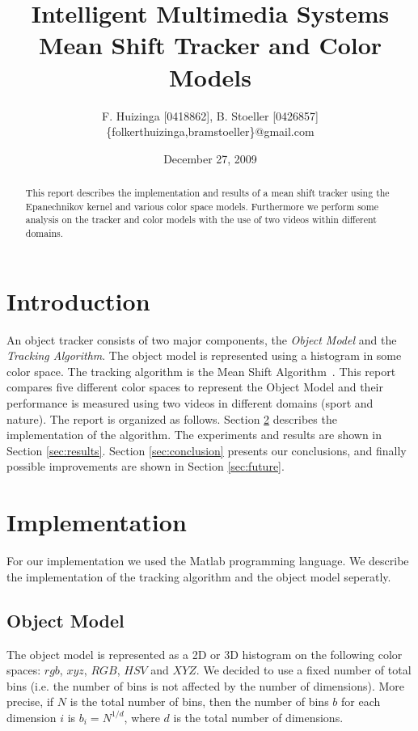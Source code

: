 \documentclass[11pt]{article}
\title{Intelligent Multimedia Systems \\ Mean Shift Tracker and Color Models}
\author{F. Huizinga [0418862], B. Stoeller [0426857] \\
      \{folkerthuizinga,bramstoeller\}@gmail.com}
\date{December 27, 2009}
\begin{document}
\maketitle

\begin{abstract}
This report describes the implementation and results of a mean shift tracker
using the Epanechnikov kernel and various color space models. Furthermore we
perform some analysis on the tracker and color models with the use of two
videos within different domains.
\end{abstract}


\section{Introduction} \label{sec:intro}
An object tracker consists of two major components, the \emph{Object Model} and
the \emph{Tracking Algorithm}. The object model is represented using a
histogram in some color space. The tracking algorithm is the Mean Shift
Algorithm~\cite{kernel-basedobject, real-timetracking}. This report compares
five different color spaces to represent the Object Model and their performance
is measured using two videos in different domains (sport and nature). The
report is organized as follows.  Section \ref{sec:implementation} describes the
implementation of the algorithm. The experiments and results are shown in
Section \ref{sec:results}. Section \ref{sec:conclusion} presents our
conclusions, and finally possible improvements are shown in Section
\ref{sec:future}.


\section{Implementation} \label{sec:implementation}
For our implementation we used the Matlab programming language. We describe the
implementation of the tracking algorithm and the object model seperatly.

\subsection{Object Model} \label{sec:model}
The object model is represented as a 2D or 3D histogram on the following color
spaces: $rgb$, $xyz$, $RGB$, $HSV$ and $XYZ$. We decided to use a fixed number
of total bins (i.e. the number of bins is not affected by the number of
dimensions).  More precise, if $N$ is the total number of bins, then the number
of bins $b$ for each dimension $i$ is $b_i = N^{1/d}$, where $d$ is the total
number of dimensions. 
\end{document}
